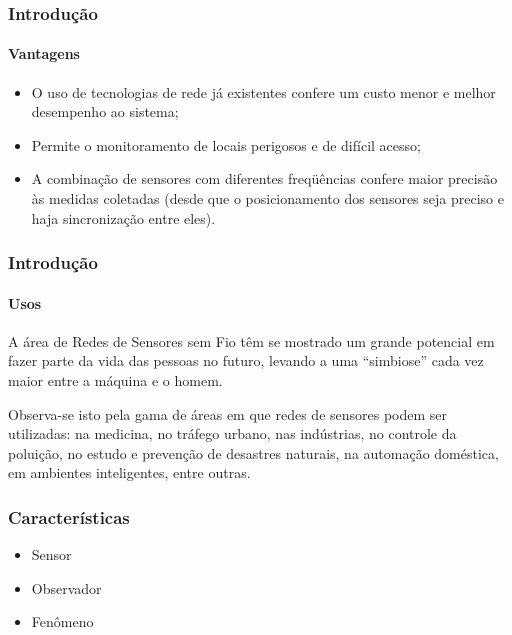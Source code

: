 \documentclass[notes]{beamer}
\begin{document}
\begin{frame}
\frametitle{Introdução}
\framesubtitle{Vantagens}

\begin{itemize}

\item O uso de tecnologias de rede já existentes confere um custo menor e melhor desempenho ao sistema; \pause

\item Permite o monitoramento de locais perigosos e de difícil acesso; \pause

\item A combinação de sensores com diferentes freqüências confere maior precisão às medidas coletadas (desde que o posicionamento dos sensores seja preciso e haja sincronização entre eles). 

\end{itemize}

\end{frame}

\begin{frame}
\frametitle{Introdução}
\framesubtitle{Usos}

\begin{block}

A área de Redes de Sensores sem Fio têm se mostrado um grande potencial em fazer parte da vida das pessoas no futuro, levando a uma “simbiose” cada vez maior entre a máquina e o homem. 

\end{block}

\begin{block}

Observa-se isto pela gama de áreas em que redes de sensores podem ser utilizadas: na medicina, no tráfego urbano, nas indústrias, no controle da poluição, no estudo e prevenção de desastres naturais, na automação doméstica, em ambientes inteligentes, entre outras. 

\end{block}

\end{frame}

\begin{frame}

\frametitle{Características}

\begin{itemize}

\item Sensor \pause

\item Observador \pause

\item Fenômeno

\end{itemize}

\end{frame}
\end{document}

